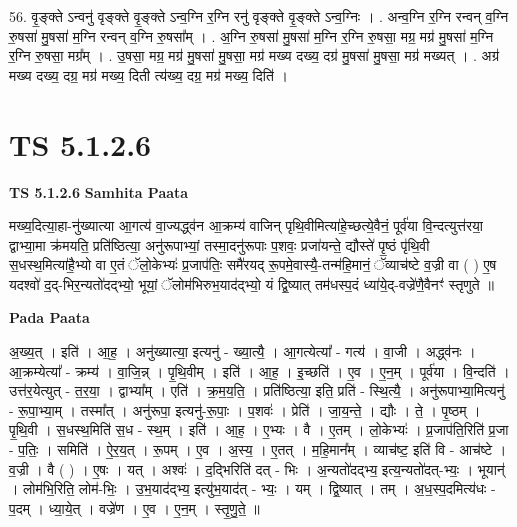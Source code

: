 \documentclass[17pt]{extarticle}
\begin{document}
56. वृ॒ङ्क्ते ऽन्वनु॑ वृङ्क्ते वृ॒ङ्क्ते ऽन्व॒ग्नि र॒ग्नि रनु॑ वृङ्क्ते वृ॒ङ्क्ते ऽन्व॒ग्निः । . अन्व॒ग्नि र॒ग्नि रन्वन् व॒ग्नि रु॒षसा॑ मु॒षसा॑ म॒ग्नि रन्वन् व॒ग्नि रु॒षसा᳚म् । . अ॒ग्नि रु॒षसा॑ मु॒षसा॑ म॒ग्नि र॒ग्नि रु॒षसा॒ मग्र॒ मग्र॑ मु॒षसा॑ म॒ग्नि र॒ग्नि रु॒षसा॒ मग्र᳚म् । . उ॒षसा॒ मग्र॒ मग्र॑ मु॒षसा॑ मु॒षसा॒ मग्र॑ मख्य दख्य॒ दग्र॑ मु॒षसा॑ मु॒षसा॒ मग्र॑ मख्यत् । . अग्र॑ मख्य दख्य॒ दग्र॒ मग्र॑ मख्य॒ दिती त्य॑ख्य॒ दग्र॒ मग्र॑ मख्य॒ दिति॑ । \newline
\pagebreak
{}

\section{ TS 5.1.2.6 }

\textbf{TS 5.1.2.6 } \newline
\textbf{Samhita Paata} \newline

मख्य॒दित्या॒हा-नु॑ख्यात्या आ॒गत्य॑ वा॒ज्यद्ध्व॑न आ॒क्रम्य॑ वाजिन् पृथि॒वीमित्या॑हे॒च्छत्ये॒वैनं॒ पूर्व॑या वि॒न्दत्युत्त॑रया॒ द्वाभ्या॒मा क्र॑मयति॒ प्रति॑ष्ठित्या॒ अनु॑रूपाभ्यां॒ तस्मा॒दनु॑रूपाः प॒शवः॒ प्रजा॑यन्ते॒ द्यौस्ते॑ पृ॒ष्ठं पृ॑थि॒वी स॒धस्थ॒मित्या॑है॒भ्यो वा ए॒तं ॅलो॒केभ्यः॑ प्र॒जाप॑तिः॒ समै॑रयद् रू॒पमे॒वास्यै॒-तन्म॑हि॒मानं॒ ॅव्याच॑ष्टे व॒ज्री वा ( ) ए॒ष यदश्वो॑ द॒द्-भिर॒न्यतो॑दद्भ्यो॒ भूयां॒ ॅलोम॑भिरुभ॒याद॑द्भ्यो॒ यं द्वि॒ष्यात् तम॑धस्प॒दं ध्या॑ये॒द्-वज्रे॑णै॒वैनꣳ॑ स्तृणुते ॥ \newline

\textbf{Pada Paata} \newline

अ॒ख्य॒त् । इति॑ । आ॒ह॒ । अनु॑ख्यात्या॒ इत्यनु॑ - ख्या॒त्यै॒ । आ॒गत्येत्या᳚ - गत्य॑ । वा॒जी । अद्ध्व॑नः । आ॒क्रम्येत्या᳚ - क्रम्य॑ । वा॒जि॒न्न् । पृ॒थि॒वीम् । इति॑ । आ॒ह॒ । इ॒च्छति॑ । ए॒व । ए॒न॒म् । पूर्व॑या । वि॒न्दति॑ । उत्त॑र॒येत्युत् - त॒र॒या॒ । द्वाभ्या᳚म् । एति॑ । क्र॒म॒य॒ति॒ । प्रति॑ष्ठित्या॒ इति॒ प्रति॑ - स्थि॒त्यै॒ । अनु॑रूपाभ्या॒मित्यनु॑ - रू॒पा॒भ्या॒म् । तस्मा᳚त् । अनु॑रूपा॒ इत्यनु॑-रू॒पाः॒ । प॒शवः॑ । प्रेति॑ । जा॒य॒न्ते॒ । द्यौः । ते॒ । पृ॒ष्ठम् । पृ॒थि॒वी । स॒धस्थ॒मिति॑ स॒ध - स्थ॒म् । इति॑ । आ॒ह॒ । ए॒भ्यः । वै । ए॒तम् । लो॒केभ्यः॑ । प्र॒जाप॑ति॒रिति॑ प्र॒जा - प॒तिः॒ । समिति॑ । ऐ॒र॒य॒त् । रू॒पम् । ए॒व । अ॒स्य॒ । ए॒तत् । म॒हि॒मान᳚म् । व्याच॑ष्ट॒ इति॑ वि - आच॑ष्टे । व॒ज्री । वै ( ) । ए॒षः । यत् । अश्वः॑ । द॒द्भिरिति॑ दत् - भिः । अ॒न्यतो॑दद्भ्य॒ इत्य॒न्यतो॑दत्-भ्यः॒ । भूयान्॑ । लोम॑भि॒रिति॒ लोम॑-भिः॒ । उ॒भ॒याद॑द्भ्य॒ इत्यु॑भ॒याद॑त् - भ्यः॒ । यम् । द्वि॒ष्यात् । तम् । अ॒ध॒स्प॒दमित्य॑धः - प॒दम् । ध्या॒ये॒त् । वज्रे॑ण । ए॒व । ए॒न॒म् । स्तृ॒णु॒ते॒ ॥  \newline
\end{document}
